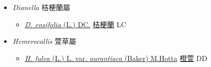 
  \begin{itemize}
 \item[] \textit{Dianella} 桔梗蘭屬
                    
  \begin{itemize}
        \item[] \href{http://www.theplantlist.org/tpl1.1/search?q=Dianella+ensifolia}{\textit{D. ensifolia} (L.) DC.}   \href{\detokenize{http://taibnet.sinica.edu.tw/chi/taibnet_species_list.php?T2=桔梗蘭&T2_new_value=true&fr=y}}{桔梗蘭} LC
  \end{itemize}
 \item[] \textit{Hemerocallis} 萱草屬
                    
  \begin{itemize}
        \item[] \href{http://www.theplantlist.org/tpl1.1/search?q=Hemerocallis+fulva+var.+aurantiaca}{\textit{H. fulva} (L.) L. var. \textit{aurantiaca} (Baker) M.Hotta}     \href{\detokenize{http://taibnet.sinica.edu.tw/chi/taibnet_species_list.php?T2=橙萱&T2_new_value=true&fr=y}}{橙萱} DD
  \end{itemize}
  \end{itemize}
